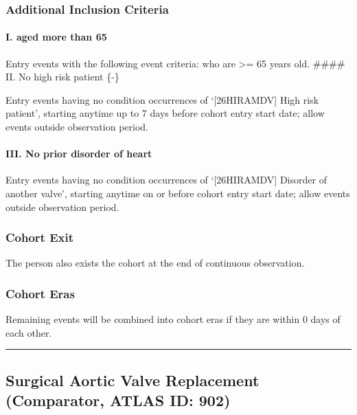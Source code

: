 \documentclass[
  12pt,
]{article}
\begin{document}
\subsubsection{Additional Inclusion
Criteria}\label{additional-inclusion-criteria}

\paragraph*{I. aged more than 65}\label{i.-aged-more-than-65}

Entry events with the following event criteria: who are \textgreater= 65
years old. \#\#\#\# II. No high risk patient \{-\}

Entry events having no condition occurrences of `{[}26HIRAMDV{]} High
risk patient', starting anytime up to 7 days before cohort entry start
date; allow events outside observation period.

\paragraph*{III. No prior disorder of
heart}\label{iii.-no-prior-disorder-of-heart}

Entry events having no condition occurrences of `{[}26HIRAMDV{]}
Disorder of another valve', starting anytime on or before cohort entry
start date; allow events outside observation period.

\subsubsection{Cohort Exit}\label{cohort-exit}

The person also exists the cohort at the end of continuous observation.

\subsubsection{Cohort Eras}\label{cohort-eras}

Remaining events will be combined into cohort eras if they are within 0
days of each other.

\begin{center}\rule{0.5\linewidth}{0.5pt}\end{center}

\subsection{Surgical Aortic Valve Replacement (Comparator, ATLAS ID:
902)}\label{surgical-aortic-valve-replacement-comparator-atlas-id-902}
\end{document}
